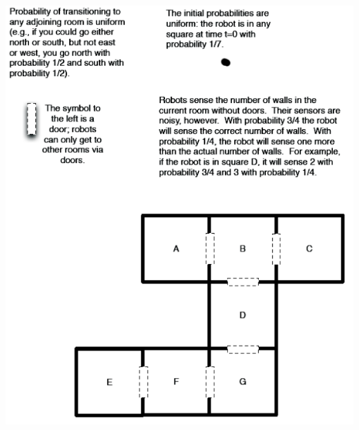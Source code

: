\documentclass[12pt]{article}
\begin{document}
\begin{center}
\includegraphics[height=7in]{prob2.png}
\end{center}
\end{document}
